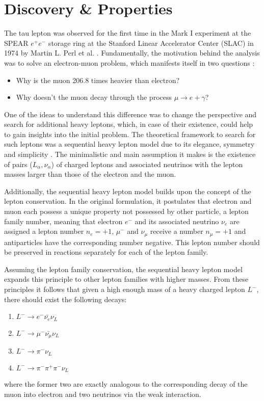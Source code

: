 \section{Discovery \& Properties} \label{tau-intro}

The tau lepton was observed for the first time in the Mark I experiment at the SPEAR $e^+e^-$ storage ring at the Stanford Linear Accelerator Center (SLAC) in 1974 by Martin L. Perl et al. \cite{Perl:1975bf}. Fundamentally, the motivation \cite{Perl:1992ad} behind the analysis was to solve  an electron-muon problem, which manifests itself in two questions \cite{Perl:1996dk}:
\begin{itemize}
    \item Why is the muon 206.8 times heavier than electron?
    \item Why doesn’t the muon decay through the process $\mu \to e + \gamma$?
\end{itemize}

One of the ideas to understand this difference was to change the perspective and search for additional heavy leptons, which, in case of their existence, could help to gain insights into the initial problem. The theoretical framework to search for such leptons was a sequential heavy lepton model due to its elegance, symmetry and simplicity \cite{Perl:past_future}. The minimalistic and main assumption it makes is the existence of pairs ($L_\alpha, \nu_\alpha$) of charged leptons and associated neutrinos with the lepton masses larger than those of the electron and the muon. 

Additionally, the sequential heavy lepton model builds upon the concept of the lepton conservation. In the original formulation, it postulates that electron and muon each possess a unique property not possessed by other particle, a lepton family number, meaning that electron $e^-$ and its associated neutrino $\nu_e$ are assigned a lepton number $n_e = +1$, $\mu^-$ and $\nu_\mu$ receive a number $n_\mu = +1$ and antiparticles have the corresponding number negative. This lepton number should be preserved in reactions separately for each of the lepton family.

Assuming the lepton family conservation, the sequential heavy lepton model expands this principle to other lepton families with higher masses.  From these principles it follows that given a high enough mass of a heavy charged lepton $L^-$, there should exist the following decays:
\begin{enumerate}[label=D\arabic*]
    \item \label{Ltoe} $L^- \to e^- \bar{\nu_e} \nu_L $ 
    \item \label{Ltomu} $L^- \to \mu^- \bar{\nu_\mu} \nu_L $
    \item $L^- \to \pi^- \nu_L $
    \item $L^- \to \pi^-\pi^+\pi^- \nu_L $
\end{enumerate}
where the former two are exactly analogous to the corresponding decay of the muon into electron and two neutrinos via the weak interaction.

